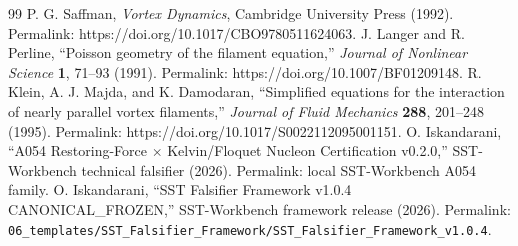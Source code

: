 \begin{thebibliography}{99}
 P. G. Saffman, \emph{Vortex Dynamics}, Cambridge University Press (1992). Permalink: https://doi.org/10.1017/CBO9780511624063.
 J. Langer and R. Perline, ``Poisson geometry of the filament equation,'' \emph{Journal of Nonlinear Science} \textbf{1}, 71--93 (1991). Permalink: https://doi.org/10.1007/BF01209148.
 R. Klein, A. J. Majda, and K. Damodaran, ``Simplified equations for the interaction of nearly parallel vortex filaments,'' \emph{Journal of Fluid Mechanics} \textbf{288}, 201--248 (1995). Permalink: https://doi.org/10.1017/S0022112095001151.
 O. Iskandarani, ``A054 Restoring-Force $\times$ Kelvin/Floquet Nucleon Certification v0.2.0,'' SST-Workbench technical falsifier (2026). Permalink: local SST-Workbench A054 family.
 O. Iskandarani, ``SST Falsifier Framework v1.0.4 CANONICAL\_FROZEN,'' SST-Workbench framework release (2026). Permalink: \texttt{06\_templates/SST\_Falsifier\_Framework/SST\_Falsifier\_Framework\_v1.0.4}.
\end{thebibliography}
